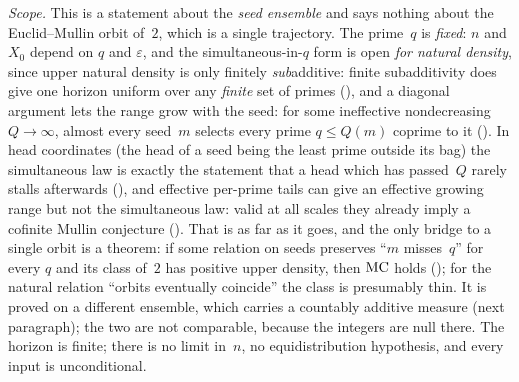 \documentclass[10pt,a4paper]{article}
\begin{document}
\noindent\emph{Scope.}  This is a statement about the \emph{seed ensemble}
and says nothing about the Euclid--Mullin orbit of~$2$, which is a single
trajectory.  The prime~$q$ is \emph{fixed}: $n$ and $X_0$ depend on $q$ and
$\varepsilon$, and the simultaneous-in-$q$ form is open \emph{for natural
density}, since upper natural density is only finitely \emph{sub}additive:
finite subadditivity does give one
horizon uniform over any \emph{finite} set of primes
(),
and a diagonal argument lets the range grow with the seed: for some
ineffective nondecreasing $Q\to\infty$, almost every seed~$m$ selects every
prime $q\le Q(m)$ coprime to it
().
In head coordinates (the head of a seed being the least prime outside its
bag) the simultaneous law is exactly the statement that a head which has
passed~$Q$ rarely stalls afterwards
(), and
effective per-prime tails can give an effective growing range but not the
simultaneous law: valid at all scales they already imply a cofinite Mullin
conjecture ().
That is as far as it goes, and the only bridge to a single orbit is a
theorem: if some relation on seeds preserves ``$m$ misses~$q$'' for every
$q$ and its class of~$2$ has positive upper density, then $\mathrm{MC}$ holds
(); for the
natural relation ``orbits eventually coincide'' the class is presumably
thin.  It is proved on a different ensemble,
which carries a countably additive measure (next paragraph); the
two are not comparable, because the integers are null there.  The horizon
is finite; there is no
limit in~$n$, no equidistribution hypothesis, and every input is
unconditional.
\end{document}
